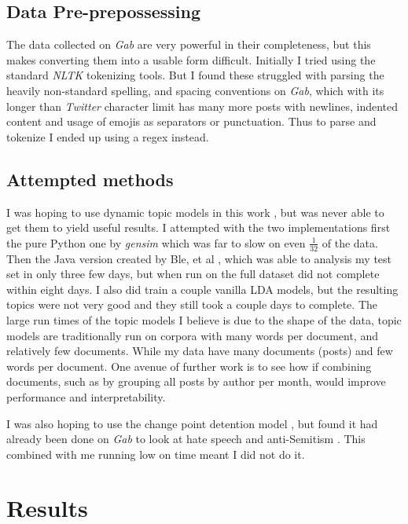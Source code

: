 \documentclass[letterpaper]{article}
\begin{document}
\subsection{Data Pre-prepossessing}

The data collected on \textit{Gab} are very powerful in their completeness, but this makes converting them into a usable form difficult. Initially I tried using the standard \textit{NLTK} \cite{loper2002nltk} tokenizing tools. But I found these struggled with parsing the heavily non-standard spelling, and spacing conventions on \textit{Gab}, which with its longer than \textit{Twitter} character limit has many more posts with newlines, indented content and usage of emojis as separators or punctuation. Thus to parse and tokenize I ended up using a regex instead.

\subsection{Attempted methods}

I was hoping to use dynamic topic models in this work \cite{blei2006dynamic}, but was never able to get them to yield useful results. I attempted with the two implementations first the pure Python one by \textit{gensim} \cite{rehurek_lrec} which was far to slow on even $\frac{1}{32}$ of the data. Then the Java version created by Ble, et al \cite{blei2006dynamic}, which was able to analysis my test set in only three few days, but when run on the full dataset did not complete within eight days. I also did train a couple vanilla LDA models, but the resulting topics were not very good and they still took a couple days to complete. The large run times of the topic models I believe is due to the shape of the data, topic models are traditionally run on corpora with many words per document, and relatively few documents. While my data have many documents (posts) and few words per document. One avenue of further work is to see how if combining documents, such as by grouping all posts by author per month, would improve performance and interpretability. 

I was also hoping to use  the change point detention model \cite{kulkarni2015statistically}, but found it had already been done on \textit{Gab} to look at hate speech and anti-Semitism \cite{finkelstein2018quantitative}. This combined with me running low on time meant I did not do it.

\section{Results}
\end{document}
